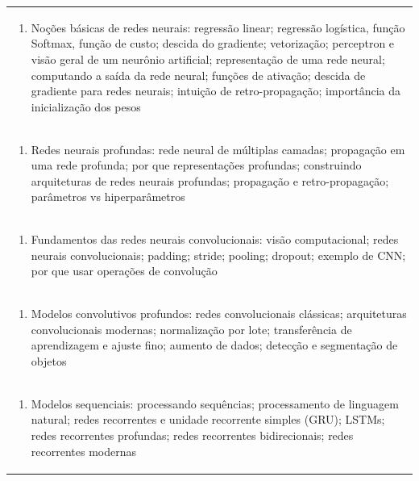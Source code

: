 \documentclass[11pt]{article}
\begin{document}
\begin{center}
\begin{longtable}{|p{4cm}|p{4cm}|p{4cm}|p{4cm}|}
\multicolumn{4}{|p{\dimexpr 16cm + 6\tabcolsep\relax}|}{\begin{enumerate}[start=2]\item Noções básicas de redes neurais: regressão linear; regressão logística, função Softmax, função de custo; descida do gradiente; vetorização; perceptron e visão geral de um neurônio artificial; representação de uma rede neural; computando a saída da rede neural; funções de ativação; descida de gradiente para redes neurais; intuição de retro-propagação; importância da inicialização dos pesos\end{enumerate}}\\
\multicolumn{4}{|p{\dimexpr 16cm + 6\tabcolsep\relax}|}{\begin{enumerate}[start=3]\item Redes neurais profundas: rede neural de múltiplas camadas; propagação em uma rede profunda; por que representações profundas; construindo arquiteturas de redes neurais profundas; propagação e retro-propagação; parâmetros vs hiperparâmetros\end{enumerate}}\\
\multicolumn{4}{|p{\dimexpr 16cm + 6\tabcolsep\relax}|}{\begin{enumerate}[start=4]\item Fundamentos das redes neurais convolucionais: visão computacional; redes neurais convolucionais; padding; stride; pooling; dropout; exemplo de CNN; por que usar operações de convolução\end{enumerate}}\\
\multicolumn{4}{|p{\dimexpr 16cm + 6\tabcolsep\relax}|}{\begin{enumerate}[start=5]\item Modelos convolutivos profundos: redes convolucionais clássicas; arquiteturas convolucionais modernas; normalização por lote; transferência de aprendizagem e ajuste fino; aumento de dados; detecção e segmentação de objetos\end{enumerate}}\\
\multicolumn{4}{|p{\dimexpr 16cm + 6\tabcolsep\relax}|}{\begin{enumerate}[start=6]\item Modelos sequenciais: processando sequências; processamento de linguagem natural; redes recorrentes e unidade recorrente simples (GRU); LSTMs; redes recorrentes profundas; redes recorrentes bidirecionais; redes recorrentes modernas\end{enumerate}}\\

\end{longtable}
\end{center}
\end{document}
